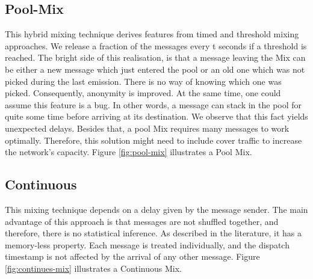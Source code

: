 \documentclass[logo,msc,cyber]{infthesis}   %
\begin{document}
\subsection{Pool-Mix}
This hybrid mixing technique\cite{diaz2003generalising} derives features from
timed and threshold mixing approaches. We release a fraction of the messages
every t seconds if a threshold is reached. The bright side of this realisation,
is that a message leaving the Mix can be either a new message which just entered
the pool or an old one which was not picked during the last emission. There is
no way of knowing which one was picked. Consequently, anonymity is improved. At
the same time, one could assume this feature is a bug. In other words, a message
can stack in the pool for quite some time before arriving at its destination. We
observe that this fact yields unexpected delays. Besides that, a pool Mix
requires many messages to work optimally. Therefore, this solution might need to
include cover traffic to increase the network's capacity. Figure
\ref{fig:pool-mix} illustrates a Pool Mix.

\subsection{Continuous}
This mixing technique depends on a delay given by the message
sender\cite{kesdogan1998stop}. The main advantage of this approach is that
messages are not shuffled together, and therefore, there is no statistical
inference. As described in the literature, it has a memory-less
property\cite{piotrowska2017loopix}. Each message is treated individually, and
the dispatch timestamp is not affected by the arrival of any other message.
Figure \ref{fig:continues-mix} illustrates a Continuous Mix.
\end{document}
